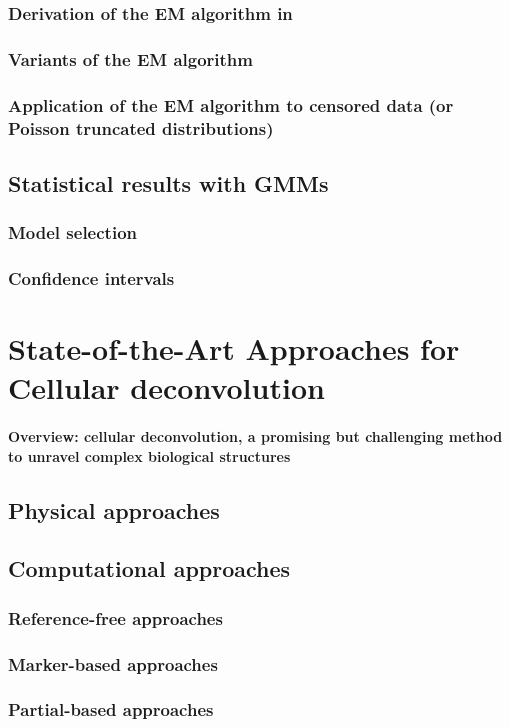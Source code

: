 \subsubsection{Derivation of the EM algorithm in }
\subsubsection{Variants of the EM algorithm}


\subsubsection{Application of the EM algorithm to censored data (or Poisson truncated distributions)}


\subsection{Statistical results with GMMs}

\subsubsection{Model selection}

\subsubsection{Confidence intervals}




\section{State-of-the-Art Approaches for Cellular deconvolution}
\paragraph{Overview: cellular deconvolution, a promising but challenging method to unravel complex biological structures}

\subsection{Physical approaches}


\subsection{Computational approaches}

\subsubsection{Reference-free approaches}

\subsubsection{Marker-based approaches}

\subsubsection{Partial-based approaches}



